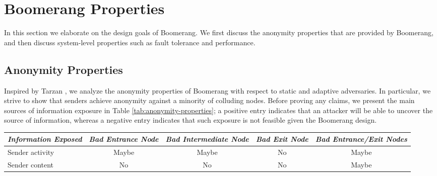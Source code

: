\section{Boomerang Properties} \label{sec:properties}
In this section we elaborate on the design goals of Boomerang. We first discuss the anonymity properties that are provided by Boomerang, and then discuss system-level properties such as fault tolerance and performance.

\subsection{Anonymity Properties}
Inspired by Tarzan \cite{tarzan}, we analyze the anonymity properties of Boomerang with respect to static and adaptive adversaries. In particular, we strive to show that senders achieve anonymity against a minority of colluding nodes. Before proving any claims, we present the main sources of information exposure in Table \ref{tab:anonymity-properties}; a positive entry indicates that an attacker will be able to uncover the source of information, whereas a negative entry indicates that such exposure is not feasible given the Boomerang design.

\begin{table*}[t]
\begin{center}
	\caption {Boomerang information exposure.}
    \label{tab:anonymity-properties}
    \begin{tabular}{|l||c|c|c|c|}
    \hline
    \emph{Information Exposed} & \emph{Bad Entrance Node} & \emph{Bad Intermediate Node} & \emph{Bad Exit Node} & \emph{Bad Entrance/Exit Nodes} \\ \hline \hline
    Sender activity & Maybe    & Maybe & No & Maybe \\ \hline
    Sender content  & No       & No    & No & Maybe \\ \hline
    \end{tabular}
\end{center}
\end{table*}


